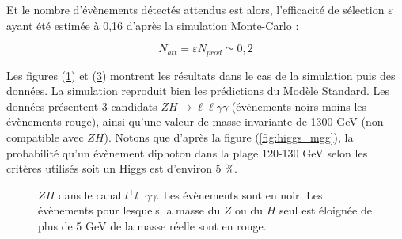 \documentclass[11pt]{article} %
\begin{document}
Et le nombre d'évènements détectés attendus est alors, l'efficacité de sélection $\varepsilon$ ayant été estimée à 0,16 d'après la simulation Monte-Carlo :

\begin{equation}
N_{att} =\varepsilon N_{prod} \simeq 0,2
\end{equation}

Les figures (\ref{fig:mzh_mc}) et (\ref{fig:mzh_data}) montrent les résultats dans le cas de la simulation puis des données. La simulation reproduit bien les prédictions du Modèle Standard\cite{zh_mass}. Les données présentent 3 candidats $ZH \to \ell\ell\gamma\gamma$ (évènements noirs moins les évènements rouge), ainsi qu'une valeur de masse invariante de 1300 GeV (non compatible avec $ZH$). Notons que d'après la figure (\ref{fig:higgs_mgg}), la probabilité qu'un évènement diphoton dans la plage 120-130 GeV selon les critères utilisés soit un Higgs est d'environ 5 \%.
\begin{figure}[H]
\begin{subfigure}[b]{.5\linewidth}
\label{fig:mzh_mc} 
 \resizebox{1.1\linewidth}{!}{}
\end{subfigure}%
\begin{subfigure}[b]{.5\linewidth}
\raggedright
\label{fig:mzh_data} 
 \resizebox{1.1\linewidth}{!}{}
\end{subfigure}
\caption{$ZH$ dans le canal $l^+l^-\gamma\gamma$. Les évènements sont en noir. Les évènements pour lesquels la masse du $Z$ ou du $H$ seul est éloignée de plus de 5 GeV de la masse réelle sont en rouge.}
\end{figure}



\theendnotes
\end{document}
